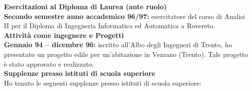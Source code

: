 \documentclass[10pt]{article}
\newcommand{\subvoice}[1] { {\large \bf #1} \smallskip\\ }
\begin{document}
\subvoice{Esercitazioni al Diploma di Laurea (ante ruolo)}
{\bf Secondo semestre anno accademico 96/97:}
esercitatore del corso di Analisi II
per il Diploma di Ingegneria Informatica ed Automatica a Rovereto.\\

\subvoice{Attivit\`a come ingegnere e Progetti}
{\bf Gennaio 94 -- dicembre 96:}
iscritto all'Albo degli Ingegneri di Trento,
ho presentato un progetto edile
per un'abitazione in Vezzano (Trento).
Tale progetto \`e stato approvato e realizzato.\\


\subvoice{Supplenze presso istituti di scuola superiore}
%
%
%
Ho tenuto le seguenti supplenze
presso istituti di scuola superiore:\\
\end{document}
